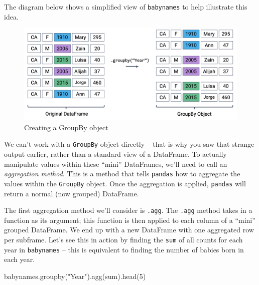 \documentclass[
  letterpaper,
  DIV=11,
  numbers=noendperiod]{scrreprt}
\newenvironment{Shaded}{\begin{snugshade}}{\end{snugshade}}
\newcommand{\BuiltInTok}[1]{\textcolor[rgb]{0.00,0.23,0.31}{#1}}
\newcommand{\DecValTok}[1]{\textcolor[rgb]{0.68,0.00,0.00}{#1}}
\newcommand{\NormalTok}[1]{\textcolor[rgb]{0.00,0.23,0.31}{#1}}
\newcommand{\StringTok}[1]{\textcolor[rgb]{0.13,0.47,0.30}{#1}}
\begin{document}
The diagram below shows a simplified view of \texttt{babynames} to help
illustrate this idea.

\begin{figure}

{\centering \includegraphics{pandas_2/images/gb.png}

}

\caption{Creating a GroupBy object}

\end{figure}

We can't work with a \texttt{GroupBy} object directly -- that is why you
saw that strange output earlier, rather than a standard view of a
DataFrame. To actually manipulate values within these ``mini''
DataFrames, we'll need to call an \emph{aggregation method}. This is a
method that tells \texttt{pandas} how to aggregate the values within the
\texttt{GroupBy} object. Once the aggregation is applied,
\texttt{pandas} will return a normal (now grouped) DataFrame.

The first aggregation method we'll consider is \texttt{.agg}. The
\texttt{.agg} method takes in a function as its argument; this function
is then applied to each column of a ``mini'' grouped DataFrame. We end
up with a new DataFrame with one aggregated row per subframe. Let's see
this in action by finding the \texttt{sum} of all counts for each year
in \texttt{babynames} -- this is equivalent to finding the number of
babies born in each year.

\begin{Shaded}
\begin{Highlighting}[]
\NormalTok{babynames.groupby(}\StringTok{"Year"}\NormalTok{).agg(}\BuiltInTok{sum}\NormalTok{).head(}\DecValTok{5}\NormalTok{)}
\end{Highlighting}
\end{Shaded}
\end{document}
